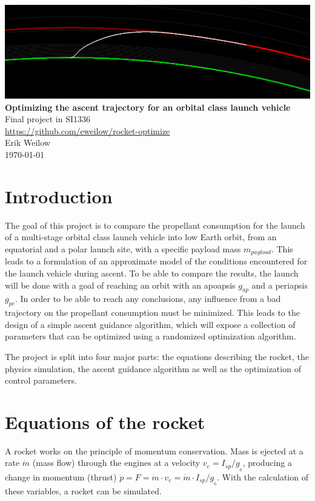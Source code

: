 \documentclass[11pt]{article}
\begin{document}
\begin{titlepage}
  \centering
  \vfill
  \vfill
  \includegraphics[width=\textwidth]{./220km.png}
  \vskip3cm
  {\Large
  \textbf{Optimizing the ascent trajectory for an orbital class launch vehicle}\\
  \vskip0.35cm
  Final project in SI1336\\
  \vskip0.25cm
  \url{https://github.com/eweilow/rocket-optimize} \\
      \vskip1cm
      Erik Weilow\\
      \vskip0.5cm
      \today\\
  }    
  \vfill
  \vfill
\end{titlepage}
\newpage

\section{Introduction} \label{sec:intro}
The goal of this project is to compare the propellant consumption for the launch of a multi-stage orbital class launch vehicle into low Earth orbit, from an equatorial and a polar launch site, with a specific payload mass $m_{payload}$. This leads to a formulation of an approximate model of the conditions encountered for the launch vehicle during ascent. 
To be able to compare the results, the launch will be done with a goal of reaching an orbit with an apoapsis $g_{ap}$ and a periapsis $g_{pe}$. 
In order to be able to reach any conclusions, any influence from a bad trajectory on the propellant consumption must be minimized.
This leads to the design of a simple ascent guidance algorithm, which will expose a collection of parameters that can be optimized using a 
randomized optimization algorithm.

The project is split into four major parts: the equations describing the rocket, the physics simulation, the ascent guidance algorithm as well as the optimization of control parameters.

\section{Equations of the rocket}
A rocket works on the principle of momentum conservation. 
Mass is ejected at a rate $\dot{m}$ (mass flow) through the engines at a velocity $v_{e} = I_{sp} / g_{_0}$, 
producing a change in momentum (thrust) $\dot{p} = F = \dot{m} \cdot v_{e} = \dot{m} \cdot I_{sp} / g_{_0}$. 
With the calculation of these variables, a rocket can be simulated.
\end{document}
